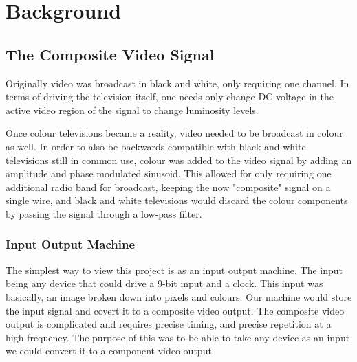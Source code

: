 \section{Background}

\subsection{The Composite Video Signal}

Originally video was broadcast in black and white, only requiring one channel.
In terms of driving the television itself, one needs only change DC voltage in
the active video region of the signal to change luminosity levels.

Once colour televisions became a reality, video needed to be broadcast in colour
as well. In order to also be backwards compatible with black and white
televisions still in common use, colour was added to the video signal by adding
an amplitude and phase modulated sinusoid. This allowed for only requiring one
additional radio band for broadcast, keeping the now "composite" signal on a
single wire, and black and white televisions would discard the colour components
by passing the signal through a low-pass filter.

\subsubsection{Input Output Machine}

The simplest way to view this project is as an input output machine. The input
being any device that could drive a 9-bit input and a clock. This input was 
basically, an image broken down into pixels and colours. Our machine would 
store the input signal and covert it to a composite video output. The composite
video output is complicated and requires precise timing, and precise repetition 
at a high frequency. The purpose of this was to be able to take any device as 
an input we could convert it to a component video output.


\subsection{}
